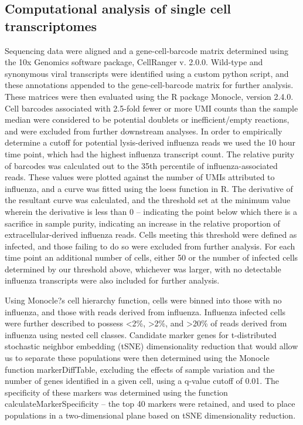 \documentclass[9pt,lineno]{elife}
\begin{document}
\subsection{Computational analysis of single cell transcriptomes}
Sequencing data were aligned and a gene-cell-barcode matrix determined using the 10x Genomics software package, CellRanger v. 2.0.0. 
Wild-type and synonymous viral transcripts were identified using a custom python script, and these annotations appended to the gene-cell-barcode matrix for further analysis.
These matrices were then evaluated using the R package Monocle, version 2.4.0.
Cell barcodes associated with 2.5-fold fewer or more UMI counts than the sample median were considered to be potential doublets or inefficient/empty reactions, and were excluded from further downstream analyses.
In order to empirically determine a cutoff for potential lysis-derived influenza reads we used the 10 hour time point, which had the highest influenza transcript count.
The relative purity of barcodes was calculated out to the 35th percentile of influenza-associated reads.
These values were plotted against the number of UMIs attributed to influenza, and a curve was fitted using the loess function in R. 
The derivative of the resultant curve was calculated, and the threshold set at the minimum value wherein the derivative is less than 0 -- indicating the point below which there is a sacrifice in sample purity, indicating an increase in the relative proportion of extracellular-derived influenza reads.
Cells meeting this threshold were defined as infected, and those failing to do so were excluded from further analysis.
For each time point an additional number of cells, either 50 or the number of infected cells determined by our threshold above, whichever was larger, with no detectable influenza transcripts were also included for further analysis.

Using Monocle?s cell hierarchy function, cells were binned into those with no influenza, and those with reads derived from influenza. 
Influenza infected cells were further described to possess <2\%, >2\%, and >20\% of reads derived from influenza using nested cell classes. 
Candidate marker genes for t-distributed stochastic neighbor embedding (tSNE) dimensionality reduction that would allow us to separate these populations were then determined using the Monocle function markerDiffTable, excluding the effects of sample variation and the number of genes identified in a given cell, using a q-value cutoff of 0.01.
The specificity of these markers was determined using the function calculateMarkerSpecificity -- the top 40 markers were retained, and used to place populations in a two-dimensional plane based on tSNE dimensionality reduction.
\end{document}
